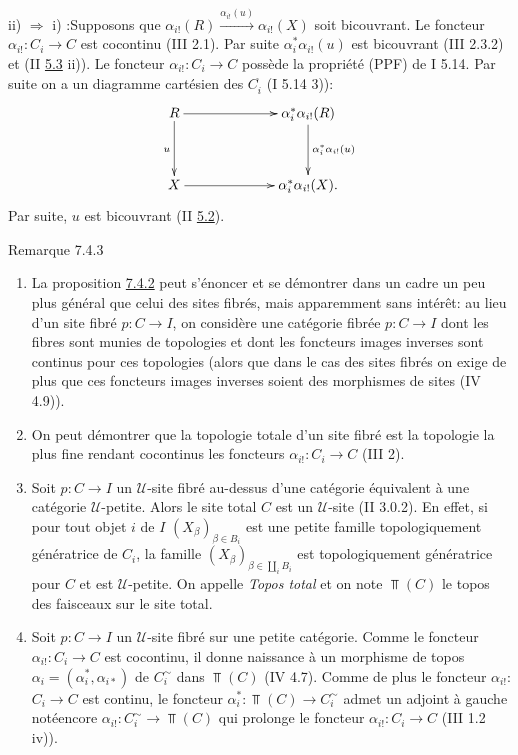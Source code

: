 \documentclass[10pt]{../fichiers-configuration-latex/smfart}
\begin{document}
ii) $\Rightarrow$ i) :\pageoriginale Supposons que $\alpha_{i!} (R)
\xrightarrow{\alpha_{i!}(u)} \alpha_{i!} (X)$ soit bicouvrant.
Le foncteur $\alpha_{i!} : C_i \to C$ est cocontinu (III 2.1). Par
suite $\alpha^{\ast}_{i} \alpha_{i!}(u)$ est bicouvrant (III 2.3.2) et
(II \hyperref[VI.cor5.3]{5.3} ii)). Le foncteur $\alpha_{i!} : C_i \to C$ possède la
propriété (PPF) de I 5.14. Par suite on a un diagramme cartésien des
$C^{\widehat{\phantom{,}}}_i$ (I 5.14 3)):
\[
\xymatrix@C=2.25cm@R=1.25cm{
R  \ar[r] \ar[d]_{u}& \alpha_i^{\ast}\alpha_{i!}(R) \ar[d]^{\alpha_i^{\ast}\alpha_{i!}(u)}\\
X     \ar[r]          & \alpha_i^{\ast}\alpha_{i!}(X).
}
\]
Par suite, $u$ est bicouvrant (II \hyperref[VI.cor5.2]{5.2}).

\begin{enonce*}[remark]{Remarque 7.4.3}
\begin{enumerate}
\renewcommand{\labelenumi}{\theenumi)}
\item La proposition \hyperref[VI.prop7.4.2]{7.4.2} peut s'énoncer et se démontrer dans un
  cadre un peu plus général que celui des sites fibrés, mais
  apparemment sans intérêt: au lieu d'un site fibré $p : C \to I$, on
  considère une catégorie fibrée $p : C \to I$ dont les fibres sont
  munies de topologies et dont les foncteurs images inverses sont
  continus pour ces topologies (alors que dans le cas des sites fibrés
  on exige de plus que ces foncteurs images inverses soient des
  morphismes de sites (IV 4.9)).

\item On peut démontrer que la topologie totale d'un site fibré est la
  topologie la plus fine rendant cocontinus les foncteurs $\alpha_{i!}
  : C_i \to C$ (III 2).

\item Soit $p : C \to I$ un $𝒰$-site fibré au-dessus d'une catégorie
  équivalent à une catégorie $𝒰$-petite. Alors le site total $C$ est un
  $𝒰$-site (II 3.0.2). En effet, si pour tout objet $i$ de $I$
  $(X_{\beta})_{\beta \in B_i}$ est une petite famille topologiquement
  génératrice de $C_i$, la famille $(X_{\beta})_{\beta \in
  \amalg_{i}B_i}$ est topologiquement génératrice pour $C$
  et est $𝒰$-petite. On appelle \emph{Topos total} et on note
  $\Top(C)$ le topos des faisceaux sur le site total.

\item Soit $p : C \to I$ un $𝒰$-site fibré sur une petite
  catégorie. Comme le foncteur $\alpha_{i!} : C_i \to C$ est
  cocontinu, il donne naissance à un morphisme de topos $\alpha_i =
  (\alpha^{\ast}_i, \alpha_{i\ast})$ de $C^{\sim}_i$ dans $\Top(C)$ (IV
  4.7). Comme de plus le foncteur $\alpha_{i!}$: $C_i \to C$ est
  continu, le foncteur $\alpha^{\ast}_i : \Top(C) \to C^{\sim}_i$ admet
  un adjoint à gauche noté\pageoriginale encore $\alpha_{i!} : C^{\sim}_i \to
  \Top(C)$ qui prolonge le foncteur $\alpha_{i!} : C_i \to C$ (III 1.2
  iv)).
\end{enumerate}
\end{enonce*}
\end{document}
